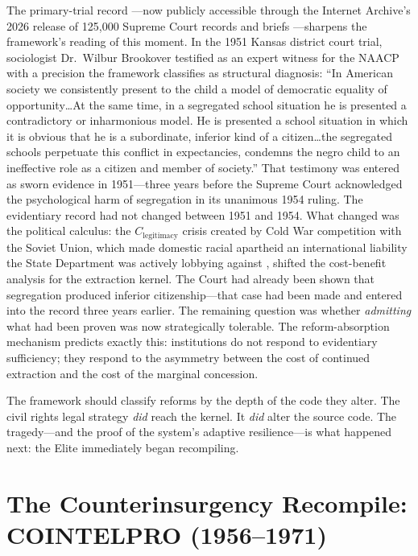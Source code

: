 The primary-trial record \cite{brown_v_board_record_1951}---now publicly accessible through the Internet Archive's 2026 release of 125,000 Supreme Court records and briefs \cite{ia_scotus_briefs_2026}---sharpens the framework's reading of this moment. In the 1951 Kansas district court trial, sociologist Dr.\ Wilbur Brookover testified as an expert witness for the NAACP with a precision the framework classifies as structural diagnosis: ``In American society we consistently present to the child a model of democratic equality of opportunity\ldots At the same time, in a segregated school situation he is presented a contradictory or inharmonious model. He is presented a school situation in which it is obvious that he is a subordinate, inferior kind of a citizen\ldots the segregated schools perpetuate this conflict in expectancies, condemns the negro child to an ineffective role as a citizen and member of society.'' That testimony was entered as sworn evidence in 1951---three years before the Supreme Court acknowledged the psychological harm of segregation in its unanimous 1954 ruling. The evidentiary record had not changed between 1951 and 1954. What changed was the political calculus: the $C_{\text{legitimacy}}$ crisis created by Cold War competition with the Soviet Union, which made domestic racial apartheid an international liability the State Department was actively lobbying against \cite{dudziak}, shifted the cost-benefit analysis for the extraction kernel. The Court had already been shown that segregation produced inferior citizenship---that case had been made and entered into the record three years earlier. The remaining question was whether \textit{admitting} what had been proven was now strategically tolerable. The reform-absorption mechanism predicts exactly this: institutions do not respond to evidentiary sufficiency; they respond to the asymmetry between the cost of continued extraction and the cost of the marginal concession.

The framework should classify reforms by the depth of the code they alter. The civil rights legal strategy \textit{did} reach the kernel. It \textit{did} alter the source code. The tragedy---and the proof of the system's adaptive resilience---is what happened next: the Elite immediately began recompiling.

\section{The Counterinsurgency Recompile: COINTELPRO (1956--1971)}
\label{sec:cointelpro_recompile}

